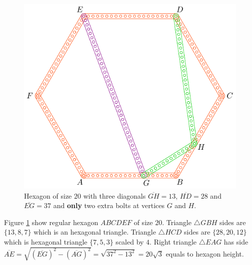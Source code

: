 \documentclass[11pt]{article}
\begin{document}
\begin{figure}[H]
\centering
\includegraphics[scale=1]{20/hexa-20a}
\caption{Hexagon of size $20$ with three diagonals $\overline{GH} = 13$, $\overline{HD} = 28$ and $\overline{EG} = 37$ and \textbf{only} two extra bolts at vertices $G$ and $H$.}
\label{fig:20a}
\end{figure}

Figure \ref{fig:20a} show regular hexagon $ABCDEF$ of size $20$. Triangle $\triangle{GBH}$ sides are $\{13,8,7\}$ which is an hexagonal triangle. Triangle $\triangle{HCD}$ sides are $\{28,20,12\}$ which is hexagonal triangle $\{7,5,3\}$ scaled by $4$. Right triangle $\triangle{EAG}$ has side $\overline{AE} = \sqrt{(\overline{EG})^2 - (\overline{AG})^2} = \sqrt{37^2 - 13^2} = 20\sqrt3$ equals to hexagon height.
\end{document}
